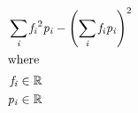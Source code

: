 \documentclass[12pt]{article}
\begin{document}
\begin{center}
\resizebox{\textwidth}{!} 
{
\begin{minipage}[c]{\textwidth}
\begin{align*}
 \omit \span \sum_\mathit{i} {\mathit{f}_{ \mathit{i} }}^{2}\mathit{p}_{ \mathit{i} } - {\left( \sum_\mathit{i} \mathit{f}_{ \mathit{i} }\mathit{p}_{ \mathit{i} } \right)}^{2} \\
\intertext{where} 
\mathit{f}_{\mathit{i}} & \in \mathbb{R} \\
\mathit{p}_{\mathit{i}} & \in \mathbb{R} \\
\\
\end{align*}
\end{minipage}
}
\end{center}
\end{document}
